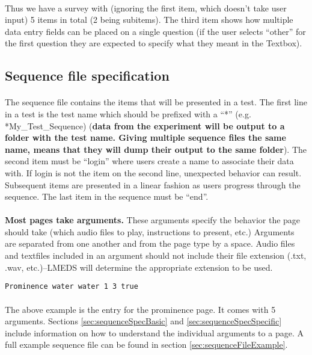 \paragraph{}
Thus we have a survey with (ignoring the first item, which doesn't take user input) 5 items in total (2 being subitems).  The third item shows how multiple data entry fields can be placed on a single question (if the user selects ``other'' for the first question they are expected to specify what they meant in the Textbox).

\subsection{Sequence file specification}
\label{sec:sequenceSpec}

\paragraph{}
The sequence file contains the items that will be presented in a test.  The first line in a test is the test name which should be prefixed with a ``*'' (e.g. *My\_Test\_Sequence) (\textbf{data from the experiment will be output to a folder with the test name.  Giving multiple sequence files the same name, means that they will dump their output to the same folder}).  The second item must be ``login'' where users create a name to associate their data with.  If login is not the item on the second line, unexpected behavior can result.
Subsequent items are presented in a linear fashion as users progress through the sequence.  The last item in the sequence must be ``end''.

\paragraph{}
\textbf{Most pages take arguments.}  These arguments specify the behavior the page should take (which audio files to play, instructions to present, etc.)  Arguments are separated from one another and from the page type by a space.  Audio files and textfiles included in an argument should not include their file extension (.txt, .wav, etc.)--LMEDS will determine the appropriate extension to be used.

\begin{lstlisting}
Prominence water water 1 3 true
\end{lstlisting}

\paragraph{}
The above example is the entry for the prominence page.  It comes with 5 arguments.  Sections \ref{sec:sequenceSpecBasic} and \ref{sec:sequenceSpecSpecific} include information on how to understand the individual arguments to a page.  A full example sequence file can be found in section \ref{sec:sequenceFileExample}.


